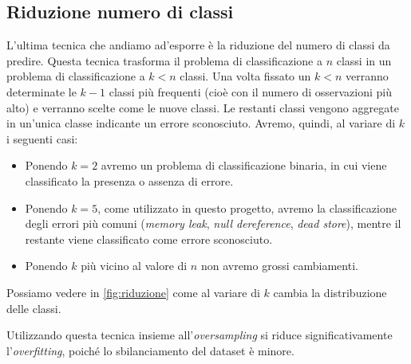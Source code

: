 \subsection{Riduzione numero di classi}
L'ultima tecnica che andiamo ad'esporre è la riduzione del numero di classi da predire.
Questa tecnica trasforma il problema di classificazione a $n$ classi in un problema di classificazione a $k<n$ classi.
Una volta fissato un $k < n$ verranno determinate le $k - 1$ classi più frequenti (cioè con il numero di osservazioni più alto) e verranno scelte come le nuove classi.
Le restanti classi vengono aggregate in un'unica classe indicante un errore sconosciuto. 
Avremo, quindi, al variare di $k$ i seguenti casi:
    \begin{itemize}
        \item Ponendo $k=2$ avremo un problema di classificazione binaria, in cui viene classificato la presenza o assenza di errore.
        \item Ponendo $k=5$, come utilizzato in questo progetto, avremo la classificazione degli errori più comuni (\textit{memory leak}, \textit{null dereference}, \textit{dead store}), mentre il restante viene classificato come errore sconosciuto.
        \item Ponendo $k$ più vicino al valore di $n$ non avremo grossi cambiamenti.
    \end{itemize}
Possiamo vedere in \autoref{fig:riduzione} come al variare di $k$ cambia la distribuzione delle classi. 

Utilizzando questa tecnica insieme all'\textit{oversampling} si riduce significativamente l'\textit{overfitting}, poiché lo sbilanciamento del dataset è minore.


